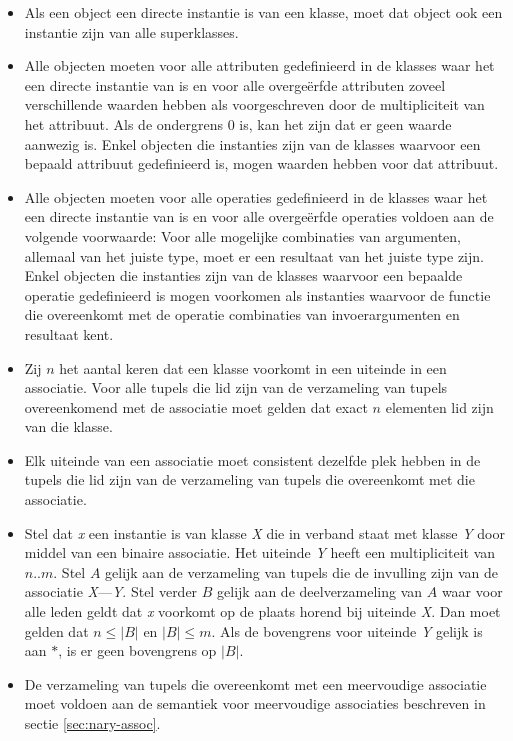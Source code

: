 \begin{itemize}
	\item Als een object een directe instantie is van een klasse, moet dat object ook een instantie zijn van alle superklasses.
	\item Alle objecten moeten voor alle attributen gedefinieerd in de klasses waar het een directe instantie van is en voor alle overge\"erfde attributen zoveel verschillende waarden hebben als voorgeschreven door de multipliciteit van het attribuut. Als de ondergrens 0 is, kan het zijn dat er geen waarde aanwezig is. Enkel objecten die instanties zijn van de klasses waarvoor een bepaald attribuut gedefinieerd is, mogen waarden hebben voor dat attribuut.
	\item Alle objecten moeten voor alle operaties gedefinieerd in de klasses waar het een directe instantie van is en voor alle overge\"erfde operaties voldoen aan de volgende voorwaarde: Voor alle mogelijke combinaties van argumenten, allemaal van het juiste type, moet er een resultaat van het juiste type zijn. Enkel objecten die instanties zijn van de klasses waarvoor een bepaalde operatie gedefinieerd is mogen voorkomen als instanties waarvoor de functie die overeenkomt met de operatie combinaties van invoerargumenten en resultaat kent.
	\item Zij $n$ het aantal keren dat een klasse voorkomt in een uiteinde in een associatie. Voor alle tupels die lid zijn van de verzameling van tupels overeenkomend met de associatie moet gelden dat exact $n$ elementen lid zijn van die klasse.
	\item Elk uiteinde van een associatie moet consistent dezelfde plek hebben in de tupels die lid zijn van de verzameling van tupels die overeenkomt met die associatie.
	\item Stel dat \textit{x} een instantie is van klasse \textit{X} die in verband staat met klasse \textit{Y} door middel van een binaire associatie. Het uiteinde \textit{Y} heeft een multipliciteit van $n..m$. Stel $A$ gelijk aan de verzameling van tupels die de invulling zijn van de associatie \textit{X}---\textit{Y}. Stel verder $B$ gelijk aan de deelverzameling van $A$ waar voor alle leden geldt dat \textit{x} voorkomt op de plaats horend bij uiteinde \textit{X}. Dan moet gelden dat $n \leq |B|$ en $|B| \leq m$. Als de bovengrens voor uiteinde \textit{Y} gelijk is aan $*$, is er geen bovengrens op $|B|$.
	\item De verzameling van tupels die overeenkomt met een meervoudige associatie moet voldoen aan de semantiek voor meervoudige associaties beschreven in sectie \ref{sec:nary-assoc}.
\end{itemize}

